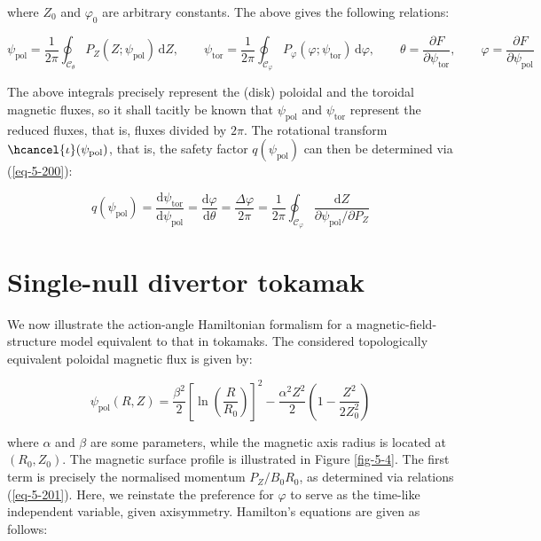 where $Z_0$ and $\varphi_0$ are arbitrary constants. The above gives the following relations:

\begin{equation}
    \psi_\text{pol}=\frac{1}{2\pi}\oint_{\mathcal{C}_\theta}P_Z(Z;\psi_\text{pol})\,\text{d}Z,\qquad\psi_\text{tor}=\frac{1}{2\pi}\oint_{\mathcal{C}_\varphi}P_\varphi(\varphi;\psi_\text{tor})\,\text{d}\varphi,\qquad\theta=\frac{\partial F}{\partial\psi_\text{tor}},\qquad\varphi=\frac{\partial F}{\partial\psi_\text{pol}}
\end{equation}

The above integrals precisely represent the (disk) poloidal and the toroidal magnetic fluxes, so it shall tacitly be known that $\psi_\text{pol}$ and $\psi_\text{tor}$ represent the reduced fluxes, that is, fluxes divided by $2\pi$. The rotational transform $\hcancel{\iota}(\psi_\text{pol})$, that is, the safety factor $q(\psi_\text{pol})$ can then be determined via (\ref{eq-5-200}):

\begin{equation}
    q(\psi_\text{pol})=\frac{\mathrm{d}\psi_\text{tor}}{\mathrm{d}\psi_\text{pol}}=\frac{\mathrm{d}\varphi}{\mathrm{d}\theta}=\frac{\Delta\varphi}{2\pi}=\frac{1}{2\pi}\oint_{\mathcal{C}_\varphi}\frac{\mathrm{d}Z}{\partial\psi_\text{pol}/\partial P_Z}
\end{equation}

\section{Single-null divertor tokamak}

We now illustrate the action-angle Hamiltonian formalism for a magnetic-field-structure model equivalent to that in tokamaks. The considered topologically equivalent poloidal magnetic flux is given by:

\begin{equation}
    \label{eq-5-202}
    \psi_\text{pol}(R,Z)=\frac{\beta^2}{2}\left[\ln{\left(\frac{R}{R_0}\right)}\right]^2-\frac{\alpha^2Z^2}{2}\left(1-\frac{Z^2}{2Z_0^2}\right)
\end{equation}

where $\alpha$ and $\beta$ are some parameters, while the magnetic axis radius is located at $(R_0, Z_0)$. The magnetic surface profile is illustrated in Figure \ref{fig-5-4}. The first term is precisely the normalised momentum $P_Z/B_0R_0$, as determined via relations (\ref{eq-5-201}). Here, we reinstate the preference for $\varphi$ to serve as the time-like independent variable, given axisymmetry. Hamilton's equations are given as follows:

